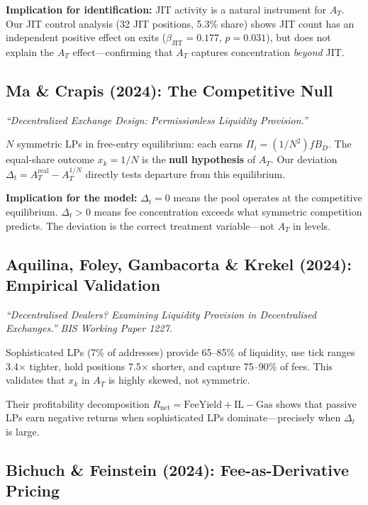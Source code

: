 \documentclass[11pt,a4paper]{article}
\begin{document}
\textbf{Implication for identification:} JIT activity is a natural
instrument for $A_T$. Our JIT control analysis (32 JIT positions, 5.3\%
share) shows JIT count has an independent positive effect on exits
($\beta_{\text{JIT}} = 0.177$, $p = 0.031$), but does not explain the
$A_T$ effect---confirming that $A_T$ captures concentration \emph{beyond}
JIT.

\subsection{Ma \& Crapis (2024): The Competitive Null}

\emph{``Decentralized Exchange Design: Permissionless Liquidity Provision.''}

$N$ symmetric LPs in free-entry equilibrium: each earns $\Pi_i =
(1/N^2) f B_D$. The equal-share outcome $x_k = 1/N$ is the \textbf{null
hypothesis} of $A_T$. Our deviation $\Delta_t = A_T^{\text{real}} -
A_T^{1/N}$ directly tests departure from this equilibrium.

\textbf{Implication for the model:} $\Delta_t = 0$ means the pool operates
at the competitive equilibrium. $\Delta_t > 0$ means fee concentration
exceeds what symmetric competition predicts. The deviation is the correct
treatment variable---not $A_T$ in levels.

\subsection{Aquilina, Foley, Gambacorta \& Krekel (2024): Empirical
Validation}

\emph{``Decentralised Dealers? Examining Liquidity Provision in
Decentralised Exchanges.'' BIS Working Paper 1227.}

Sophisticated LPs (7\% of addresses) provide 65--85\% of liquidity, use
tick ranges 3.4$\times$ tighter, hold positions 7.5$\times$ shorter, and
capture 75--90\% of fees. This validates that $x_k$ in $A_T$ is highly
skewed, not symmetric.

Their profitability decomposition $R_{\text{net}} = \text{FeeYield} +
\text{IL} - \text{Gas}$ shows that passive LPs earn negative returns when
sophisticated LPs dominate---precisely when $\Delta_t$ is large.

\subsection{Bichuch \& Feinstein (2024): Fee-as-Derivative Pricing}
\end{document}

